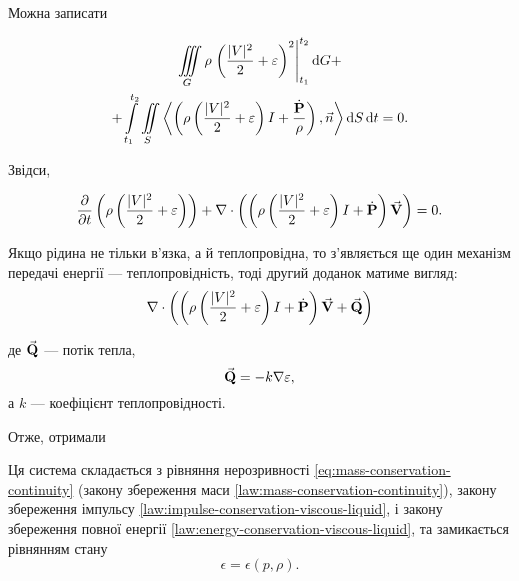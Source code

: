 Можна записати
\begin{law}
	\begin{multline}
		\Iiint_G \rho \left. \left( \frac{|V|^2}{2} + \epsilon\right)^2 \right|_{t_1}^{t_2} \diff G + \\
		+\Int_{t_1}^{t_2} \Iint_S \langle \left(\rho \left(\frac{|V|^2}{2} + \epsilon \right)I+\frac{\dot{\bf{P}}}{\rho}\right),\vec n\rangle \diff S \diff t = 0.
	\end{multline}
\end{law}

Звідси, 
\begin{law}
	\label{law:energy-conservation-viscous-liquid}
	\begin{equation}
		\label{eq:energy-conservation-viscous-liquid}
		\frac{\partial}{\partial t} \left( \rho \left( \frac{|V|^2}{2} + \varepsilon\right)\right) + \nabla \cdot \left( \left( \rho \left(\frac{|V|^2}{2} + \varepsilon\right)I + \dot{\textbf{P}}\right) {\vec{\mathbf{V}}} \right) = 0.
	\end{equation}
\end{law}

Якщо рідина не тільки в'язка, а й теплопровідна, то з'являється ще один механізм передачі енергії --- теплопровідність, тоді другий доданок матиме вигляд:
\begin{equation}
	\nabla \cdot \left( \left( \rho \left(\frac{|V|^2}{2} + \varepsilon\right)I + \dot{\textbf{P}}\right) {\vec{\mathbf{V}}} + {\vec{\mathbf{Q}}}\right)
\end{equation}

де ${\vec{\mathbf{Q}}}$ --- потік тепла,
\begin{equation}
	{\vec{\mathbf{Q}}} = - k \nabla \varepsilon,
\end{equation}
а $k$ --- коефіцієнт теплопровідності. \medskip

Отже, отримали
\begin{th_equation}
	Ця система складається з рівняння нерозривності \eqref{eq:mass-conservation-continuity} (закону збереження маси \ref{law:mass-conservation-continuity}), закону збереження імпульсу \ref{law:impulse-conservation-viscous-liquid}, і закону збереження повної енергії \ref{law:energy-conservation-viscous-liquid}, та замикається рівнянням стану
	\begin{equation}
		\epsilon = \epsilon(p, \rho).
	\end{equation}
\end{th_equation}

